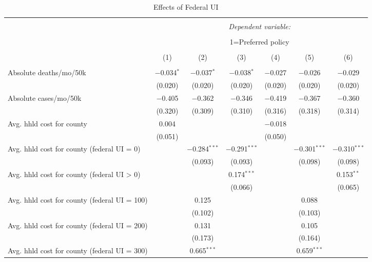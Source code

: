 
\begin{table}[!htbp] \centering 
 \scriptsize 
  \caption{Effects of Federal UI} 
  \label{} 
\begin{tabular}{@{\extracolsep{5pt}}lcccccc} 
\\[-1.8ex]\hline 
\hline \\[-1.8ex] 
 & \multicolumn{6}{c}{\textit{Dependent variable:}} \\ 
\cline{2-7} 
\\[-1.8ex] & \multicolumn{6}{c}{1=Preferred policy} \\ 
\\[-1.8ex] & (1) & (2) & (3) & (4) & (5) & (6)\\ 
\hline \\[-1.8ex] 
 Absolute deaths/mo/50k & $-$0.034$^{*}$ & $-$0.037$^{*}$ & $-$0.038$^{*}$ & $-$0.027 & $-$0.026 & $-$0.029 \\ 
  & (0.020) & (0.020) & (0.020) & (0.020) & (0.020) & (0.020) \\ 
  Absolute cases/mo/50k & $-$0.405 & $-$0.362 & $-$0.346 & $-$0.419 & $-$0.367 & $-$0.360 \\ 
  & (0.320) & (0.309) & (0.310) & (0.316) & (0.318) & (0.314) \\ 
  Avg. hhld cost for county & 0.004 &  &  & $-$0.018 &  &  \\ 
  & (0.051) &  &  & (0.050) &  &  \\ 
  Avg. hhld cost for county (federal UI = 0) &  & $-$0.284$^{***}$ & $-$0.291$^{***}$ &  & $-$0.301$^{***}$ & $-$0.310$^{***}$ \\ 
  &  & (0.093) & (0.093) &  & (0.098) & (0.098) \\ 
  Avg. hhld cost for county (federal UI > 0) &  &  & 0.174$^{***}$ &  &  & 0.153$^{**}$ \\ 
  &  &  & (0.066) &  &  & (0.065) \\ 
  Avg. hhld cost for county (federal UI = 100) &  & 0.125 &  &  & 0.088 &  \\ 
  &  & (0.102) &  &  & (0.103) &  \\ 
  Avg. hhld cost for county (federal UI = 200) &  & 0.131 &  &  & 0.105 &  \\ 
  &  & (0.173) &  &  & (0.164) &  \\ 
  Avg. hhld cost for county (federal UI = 300) &  & 0.665$^{***}$ &  &  & 0.659$^{***}$ &  \\ 

\end{tabular}
\end{table}
